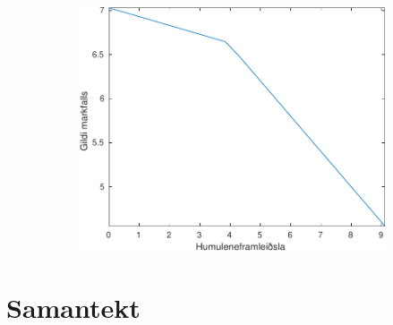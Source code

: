 \documentclass[12pt]{article}
\begin{document}
\begin{figure}
\begin{subfigure}[b]{0.45\textwidth}
\includegraphics[width=\textwidth]{Pics/BrewingRobustnessAnalysis}
\end{subfigure}
\end{figure}

\section{Samantekt}


\appendix


\end{document}
